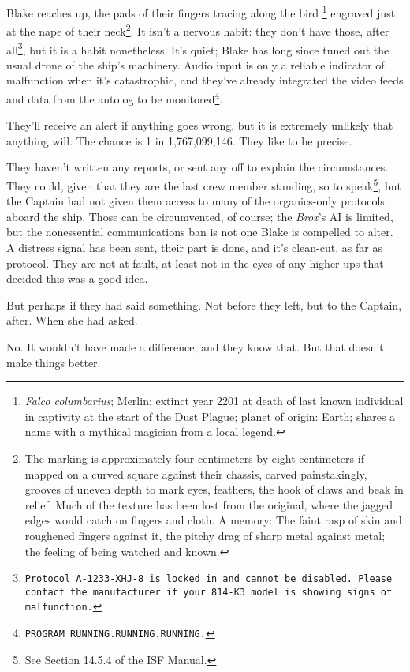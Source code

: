 Blake reaches up, the pads of their fingers tracing along the
bird \footnote{ \textit{Falco columbarius}; Merlin; extinct year 2201
at death of last known individual in captivity at the start of the
Dust Plague; planet of origin: Earth; shares a name with a mythical
magician from a local legend.} engraved just at the nape of their
neck\footnote{The marking is approximately four centimeters by eight
centimeters if mapped on a curved square against their chassis, carved
painstakingly, grooves of uneven depth to mark eyes, feathers, the
hook of claws and beak in relief. Much of the texture has been lost
from the original, where the jagged edges would catch on fingers and
cloth. A memory: The faint rasp of skin and roughened fingers against
it, the pitchy drag of sharp metal against metal; the feeling of being
watched and known.}. It isn't a nervous habit: they don't have those,
after all\footnote{\texttt{Protocol A-1233-XHJ-8 is locked in and
cannot be disabled. Please contact the manufacturer if your 814-K3
model is showing signs of malfunction.}}, but it is a habit
nonetheless. It's quiet; Blake has long since tuned out the usual
drone of the ship's machinery. Audio input is only a reliable
indicator of malfunction when it's catastrophic, and they've already
integrated the video feeds and data from the autolog to be
monitored\footnote{\texttt{PROGRAM
RUNNING\textellipsis{}.RUNNING\textellipsis{}.RUNNING\textellipsis{}.}}.

They'll receive an alert if anything goes wrong, but it is extremely
unlikely that anything will. The chance is 1 in 1,767,099,146. They
like to be precise.

They haven't written any reports, or sent any off to explain the
circumstances. They could, given that they are the last crew member
standing, so to speak\footnote{See Section 14.5.4 of the ISF Manual.},
but the Captain had not given them access to many of the organics-only
protocols aboard the ship. Those can be circumvented, of course;
the \textit{Brox}'s AI is limited, but the nonessential communications
ban is not one Blake is compelled to alter. A distress signal has been
sent, their part is done, and it's clean-cut, as far as protocol. They
are not at fault, at least not in the eyes of any higher-ups that
decided this was a good idea.

But perhaps if they had said something. Not before they left, but to
the Captain, after. When she had asked.

No. It wouldn't have made a difference, and they know that. But that
doesn't make things better.

